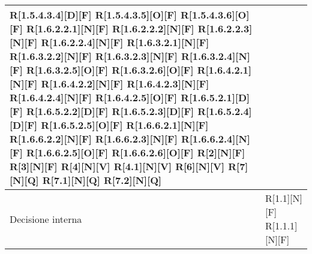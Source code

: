 \begin{longtable}{X | X}
R[1.5.4.3.4][D][F] \newline
R[1.5.4.3.5][O][F] \newline
R[1.5.4.3.6][O][F] \newline
R[1.6.2.2.1][N][F] \newline
R[1.6.2.2.2][N][F] \newline
R[1.6.2.2.3][N][F] \newline
R[1.6.2.2.4][N][F] \newline
R[1.6.3.2.1][N][F] \newline
R[1.6.3.2.2][N][F] \newline
R[1.6.3.2.3][N][F] \newline
R[1.6.3.2.4][N][F] \newline
R[1.6.3.2.5][O][F] \newline
R[1.6.3.2.6][O][F] \newline
R[1.6.4.2.1][N][F] \newline
R[1.6.4.2.2][N][F] \newline
R[1.6.4.2.3][N][F] \newline
R[1.6.4.2.4][N][F] \newline
R[1.6.4.2.5][O][F] \newline
R[1.6.5.2.1][D][F] \newline
R[1.6.5.2.2][D][F] \newline
R[1.6.5.2.3][D][F] \newline
R[1.6.5.2.4][D][F] \newline
R[1.6.5.2.5][O][F] \newline
R[1.6.6.2.1][N][F] \newline
R[1.6.6.2.2][N][F] \newline
R[1.6.6.2.3][N][F] \newline
R[1.6.6.2.4][N][F] \newline
R[1.6.6.2.5][O][F] \newline
R[1.6.6.2.6][O][F] \newline
R[2][N][F] \newline
R[3][N][F] \newline
R[4][N][V] \newline
R[4.1][N][V] \newline
R[6][N][V] \newline
R[7][N][Q] \newline
R[7.1][N][Q] \newline
R[7.2][N][Q]  \\
\hline
Decisione interna & R[1.1][N][F] \newline
R[1.1.1][N][F] \newline

\end{longtable}
